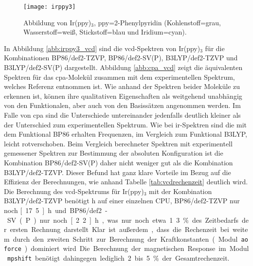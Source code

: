 \begin{figure}[ht!]
	\centering
	\texttt{[image: irppy3]}
	\captionsetup{figurewithin = chapter}
	\captionsetup{font=small, labelfont=bf}\caption[Abbildung von Ir(ppy)$_3$]{Abbildung von Ir(ppy)$_3$, ppy=2-Phenylpyridin (Kohlenstoff=grau, Wasserstoff=weiß, Stickstoff=blau und Iridium=cyan).}
\label{abb:irppy3}
\end{figure}
\FloatBarrier




In Abbildung \ref{abb:irppy3_vcd} sind die \ac{vcd}-Spektren von Ir(ppy)$_3$ für die Kombinationen BP86/def2-TZVP, BP86/def2-SV(P), B3LYP/def2-TZVP und B3LYP/def2-SV(P) dargestellt. Abbildung \ref{abb:cpa_vcd} zeigt die äquivalenten Spektren für das \ac{cpa}-Molekül zusammen mit dem experimentellen Spektrum, welches Referenz \cite{brotin2006vibrational} entnommen ist. Wie anhand der Spektren beider Moleküle zu erkennen ist, können ihre qualitativen Eigenschaften als weitgehend unabhängig von den Funktionalen, aber auch von den Basissätzen angenommen werden. Im Falle von \ac{cpa} sind die Unterschiede untereinander jedenfalls deutlich kleiner als der Unterschied zum experimentellen Spektrum. Wie bei \ac{ir}-Spektren sind die mit dem Funktional BP86 erhalten Frequenzen, im Vergleich zum Funktional B3LYP, leicht rotverschoben. Beim Vergleich berechneter Spektren mit experimentell gemessener Spektren zur Bestimmung der absoluten Konfiguration ist die Kombination BP86/def2-SV(P) daher nicht weniger gut als die Kombination B3LYP/def2-TZVP. Dieser Befund hat ganz klare Vorteile im Bezug auf die Effizienz der Berechnungen, wie anhand Tabelle \ref{tab:vcdrechenzeit} deutlich wird. Die Berechnung des \ac{vcd}-Spektrums für Ir(ppy)$_3$ mit der Kombination B3LYP/def2-TZVP benötigt \unit[166]{h} auf einer einzelnen CPU, BP86/def2-TZVP nur noch \unit[17.5]{h} und BP86/def2-SV(P) nur noch \unit[2.2]{h}, was nur noch etwa 1.3 \% des Zeitbedarfs der ersten Rechnung darstellt. Klar ist außerdem, dass die Rechenzeit bei weitem durch den zweiten Schritt zur Berechnung der Kraftkonstanten (Modul \texttt{aoforce}) dominiert wird. Die Berechnung der magnetischen Response im Modul \texttt{mpshift} benötigt dahingegen lediglich 2 bis 5 \% der Gesamtrechenzeit. 

